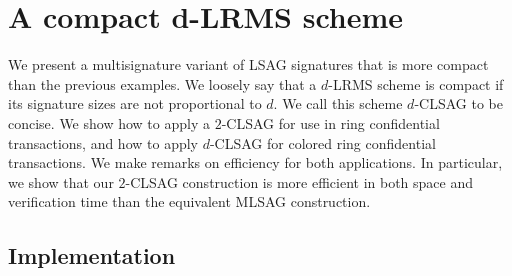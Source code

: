 \documentclass{article}
\theoremstyle{plain}
\theoremstyle{definition}
\begin{document}
\section{A compact d-LRMS scheme}

We present a multisignature variant of LSAG signatures that is more compact than the previous examples. We loosely say that a $d$-LRMS scheme is compact if its signature sizes are not proportional to $d$. We call this scheme $d$-CLSAG to be concise. We show how to apply a $2$-CLSAG for use in ring confidential transactions, and how to apply $d$-CLSAG for colored ring confidential transactions. We make remarks on efficiency for both applications. In particular, we show that our $2$-CLSAG construction is more efficient in both space and verification time than the equivalent MLSAG construction.


\subsection{Implementation}\label{sec:implem}
\end{document}
